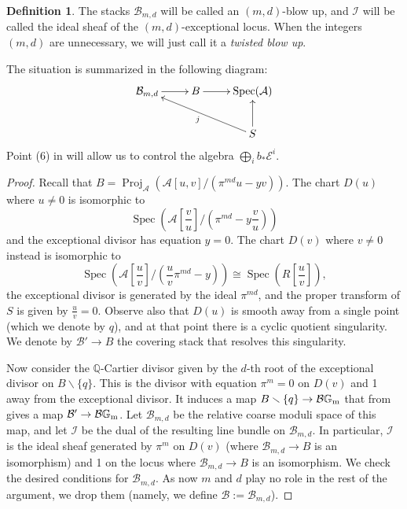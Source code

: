 \documentclass{amsart}
\newcommand{\bG}{\mathbb{G}}
\newcommand{\bQ}{\mathbb{Q}}
\newcommand{\cA}{\mathcal{A}}
\newcommand{\cB}{\mathcal{B}}
\newcommand{\cE}{\mathcal{E}}
\newcommand{\cI}{\mathcal{I}}
\newcommand{\spec}{\operatorname{Spec}}
\newcommand{\Gm}{\bG_{{\rm m}}}
\theoremstyle{definition}
\newtheorem{Def}[theorem]{Definition}
\begin{document}
\begin{Def}
The stacks $\cB_{m,d}$ will be called an $(m,d)$-blow up, and $\cI$ will be called the ideal sheaf of the $(m,d)$-exceptional locus. When the integers $(m,d)$ are unnecessary, we will just call it a \emph{twisted blow up}. 
\end{Def}
The situation is summarized in the following diagram:
$$\xymatrix{\cB_{m,d}\ar[r] & B\ar[r] & \spec(\cA) \\ & & S\ar[ull]^j\ar[u]}$$
Point (6) in  will allow us to control the algebra $\bigoplus_i b_*\cE^i$.
\begin{proof}
Recall that $B=\operatorname{Proj}_{\cA}(\cA[u,v]/(\pi^{md}u-yv))$. The chart $D(u)$ where $u\neq 0$ is isomorphic to
$$\spec(\cA\left[\frac{v}{u}\right]/(\pi^{md}-y\frac{v}{u}))$$ and the exceptional divisor has equation $y=0$.
The chart $D(v)$ where $v \neq 0$ instead is isomorphic to $$\spec(\cA\left[\frac{u}{v}\right]/(\frac{u}{v}\pi^{md}-y))\cong \spec(R\left[\frac{u}{v}\right]),$$ the exceptional divisor is generated by the ideal $\pi^{md}$, and the proper transform of $S$ is given by $\frac{u}{v}=0$. Observe also that $D(u)$ is smooth away from a single point (which we denote by $q$), and at that point there is a cyclic quotient singularity. We denote by $\cB'\to B$ the covering stack that resolves this singularity.

Now consider the $\bQ$-Cartier divisor
given by the $d$-th root of the exceptional divisor on $
B\smallsetminus\{q\}$. This is the divisor with equation $\pi^m=0$ on $D(v)$ and 1 away from the exceptional divisor. It induces a map $B\smallsetminus \{q\} \to \cB\Gm$ that from  gives a map $\cB'\to \cB\Gm$. Let $\cB_{m,d}$ be the relative coarse moduli space of this map, and let $\cI$ be the dual of the resulting line bundle on $\cB_{m,d}$. In particular, $\cI$ is the ideal sheaf generated by $\pi^m$ on $D(v)$ (where $\cB_{m,d}\to B$ is an isomorphism) and 1 on the locus where $\cB_{m,d}\to B$ is an isomorphism. We check the desired conditions for $\cB_{m,d}$. As now $m$ and $d$ play no role in the rest of the argument, we drop them (namely, we define $\cB:=\cB_{m,d}$).


\end{proof}
\end{document}
